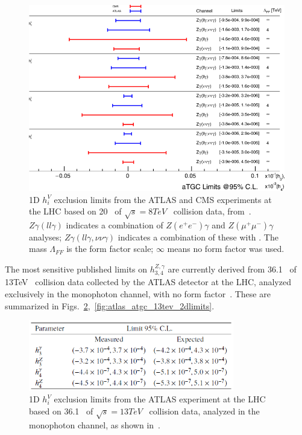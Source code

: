 \documentclass[oneside, letterpaper, 12pt, oldfontcommands]{memoir}
\begin{document}
\begin{figure}[hbtp]
  \begin{center}
    \includegraphics[width=\textwidth]{Figures/lhc_8tev_atgc_1dlimits.png}
    \caption{
      1D $h_{i}^{V}$ exclusion limits from the ATLAS and CMS experiments at the LHC based on 20 \fbinv\ of $\sqrt{s} = 8\unit{TeV}$
      \Pp\Pp\ collision data, from~\cite{ref:RevModPhys.89.035008}.
      $Z\gamma(ll\gamma)$ indicates a combination of $Z(e^\mathrm{+}e^\mathrm{-})\gamma$ and $Z(\mu^\mathrm{+}\mu^\mathrm{-})\gamma$
      analyses; $Z\gamma(ll\gamma,\nu\nu\gamma)$ indicates a combination of these with \zinvg. The mass $\Lambda_{FF}$
      is the form factor scale; $\infty$ means no form factor was used.
    }
    \label{fig:lhc_8tev_atgc_1dlimits}
  \end{center}
\end{figure}

The most sensitive published limits on $h_{3,4}^{Z,\gamma}$ are currently derived from 36.1 \fbinv\ of 13\unit{TeV} \Pp\Pp\ collision
data collected by the ATLAS detector at the LHC, analyzed exclusively in the monophoton channel, with no form factor~\cite{ref:CERN-EP-2018-220}.
These are summarized in Figs.~\ref{fig:atlas_atgc_13tev_1dlimits},~\ref{fig:atlas_atgc_13tev_2dlimits}.

\begin{figure}[hbtp]
  \begin{center}
    \includegraphics[width=0.8\textwidth]{Figures/atlas_atgc_13tev_1dlimits.png}
    \caption{
      1D $h_{i}^{V}$ exclusion limits from the ATLAS experiment at the LHC based on 36.1 \fbinv\ of $\sqrt{s} = 13\unit{TeV}$
      \Pp\Pp\ collision data, analyzed in the monophoton channel, as shown in~\cite{ref:CERN-EP-2018-220}.
    }
    \label{fig:atlas_atgc_13tev_1dlimits}
  \end{center}
\end{figure}
\end{document}
